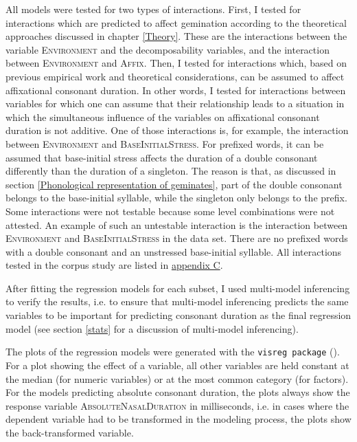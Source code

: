 All models were tested for two types of  interactions. First, I tested for interactions which are predicted to affect gemination according to the theoretical approaches discussed in chapter \ref{Theory}. These  are the interactions between the variable \textsc{Environment} and the decomposability variables, and the interaction between \textsc{Environment} and \textsc{Affix}.
Then, I tested for interactions which, based on previous empirical work and theoretical considerations, can be assumed to affect affixational consonant duration. In other words, I tested for interactions between variables for which one can assume that their relationship leads to a situation in which the simultaneous influence of the variables on affixational consonant duration is not additive. One of those interactions is, for example, the interaction between \textsc{Environment} and \textsc{BaseInitialStress}. For prefixed words, it can be assumed that base-initial stress affects the duration of a double consonant differently than the duration of a singleton. The reason is that, as discussed in section \ref{Phonological representation of geminates}, part of the double consonant belongs to the base-initial syllable, while the singleton only belongs to the prefix. 
Some interactions were not testable because some level combinations were not attested. An example of such an untestable interaction is the interaction between \textsc{Environment} and \textsc{BaseInitialStress} in the data set. There are no prefixed words with a double consonant and an unstressed base-initial syllable. All interactions tested in the corpus study are listed in \hyperref[Appendix C: Summaries of tested interactions in corpus study]{appendix C}.

After fitting the regression models for each subset, I used multi-model inferencing to verify the results, i.e. to ensure that multi-model inferencing predicts the same variables to be important for predicting consonant duration as the final regression model (see section \ref{stats} for a discussion of multi-model inferencing).




The plots of the regression models were generated with the \texttt{visreg package} (\citealt{Breheny.2015}). For a plot showing the effect of a variable, all other variables are held constant at the median (for numeric variables) or at the most common category (for factors). For the models predicting absolute consonant duration, the plots always show the response variable \textsc{AbsoluteNasalDuration} in milliseconds, i.e. in cases where the dependent variable had to be transformed in the modeling process, the plots show the back-transformed variable.



